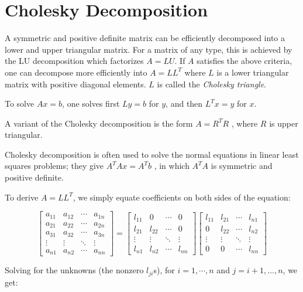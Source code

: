 \documentclass{article}
\begin{document}
\section{Cholesky Decomposition}

A symmetric and positive definite matrix can be efficiently decomposed into a lower and upper triangular matrix. For a matrix of any type, this is achieved by the LU decomposition which factorizes $A = LU$. If $A$ satisfies the above criteria, one can decompose more efficiently into $A=LL^T$ where $L$ is a lower triangular matrix with positive diagonal elements. $L$ is called the \emph{Cholesky triangle}.

To solve $Ax = b$, one solves first $Ly = b$ for $y$, and then $L^Tx=y$ for $x$.

A variant of the Cholesky decomposition is the form $A=R^TR$ , where $R$ is upper triangular.

Cholesky decomposition is often used to solve the normal equations in linear least squares problems; they give $A^TAx=A^Tb$ , in which $A^TA$ is symmetric and positive definite.

To derive $A=LL^T$, we simply equate coefficients on both sides of the equation:

$$ 
\begin{bmatrix}
 a_{11} & a_{12} & \cdots & a_{1n} \\
 a_{21} & a_{22} & \cdots & a_{2n} \\
 a_{31} & a_{32} & \cdots & a_{3n} \\
 \vdots & \vdots & \ddots & \vdots \\
 a_{n1} & a_{n2} & \cdots & a_{nn} 
\end{bmatrix}
=
\begin{bmatrix}
 l_{11} & 0      & \cdots & 0 \\
 l_{21} & l_{22} & \cdots & 0 \\
 \vdots & \vdots & \ddots & \vdots \\
 l_{n1} & l_{n2} & \cdots & l_{nn}
\end{bmatrix}
\begin{bmatrix}
 l_{11} & l_{21} & \cdots & l_{n1} \\
 0      & l_{22} & \cdots & l_{n2} \\
 \vdots & \vdots & \ddots & \vdots \\
 0      & 0      & \cdots & l_{nn}
\end{bmatrix}
$$ 

Solving for the unknowns (the nonzero $l_{ji}$s), for $i=1,\cdots ,n$ and $j=i+1,\ldots ,n$, we get:
\end{document}

